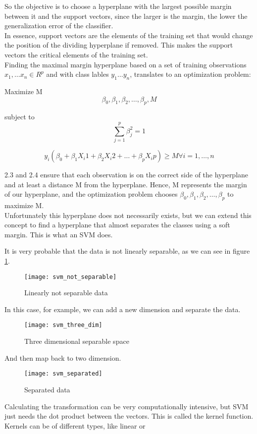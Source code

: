So the objective is to choose a hyperplane with the largest possible margin between it and the support vectors, since the larger is the margin, the lower the generalization error of the classifier.\\
In essence, support vectors are the elements of the training set that would change the position of the dividing hyperplane if removed. This makes the support vectors the critical elements of the training set.\\

Finding the maximal margin hyperplane based on a set of training observations $x_1, \dots x_n \in R^p$ and with class lables $y_1 \dots y_n$, translates to an optimization problem:

Maximize M
\begin{equation}
\beta_0, \beta_1, \beta_2, \dots, \beta_p, M
\end{equation}

subject to
\begin{equation}
\sum_{j=1}^{p}\beta^2_j = 1
\end{equation}

\begin{equation}
y_i(\beta_0 + \beta_1 X_i1 + \beta_2 X_i2 + \dots + \beta_p X_ip) \ge M \forall i = 1, \dots, n
\end{equation}

2.3 and 2.4 ensure that each observation is on the correct side of the hyperplane and at least a distance M from the hyperplane. Hence, M represents the margin of our hyperplane, and the optimization problem chooses $\beta_0, \beta_1, \beta_2, \dots, \beta_p$ to maximize M. \\
Unfortunately this hyperplane does not necessarily exists, but we can extend this concept to find a hyperplane that almost separates the classes using a soft margin. This is what an SVM does.

It is very probable that the data is not linearly separable, as we can see in figure \ref{fig:svmnotsep}.
\begin{figure}[H]
	\centering
	\texttt{[image: svm\_not\_separable]}
	\caption{Linearly not separable data \cite{svm_monkeylearn}}
	\label{fig:svmnotsep}
\end{figure}

In this case, for example, we can add a new dimension and separate the data. 
\begin{figure}[H]
	\centering
	\texttt{[image: svm\_three\_dim]}
	\caption{Three dimensional separable space \cite{svm_monkeylearn}}
\end{figure} 

And then map back to two dimension.
\begin{figure}[H]
	\centering
	\texttt{[image: svm\_separated]}
	\caption{Separated data \cite{svm_monkeylearn}}
\end{figure}



Calculating the transformation can be very computationally intensive, but SVM just needs the dot product between the vectors. This is called the kernel function. Kernels can be of different types, like linear or 

